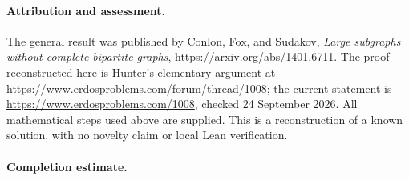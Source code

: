\paragraph{Attribution and assessment.}
The general result was published by Conlon, Fox, and Sudakov, \emph{Large subgraphs without complete bipartite graphs}, \url{https://arxiv.org/abs/1401.6711}. The proof reconstructed here is Hunter's elementary argument at \url{https://www.erdosproblems.com/forum/thread/1008}; the current statement is \url{https://www.erdosproblems.com/1008}, checked 24 September 2026. All mathematical steps used above are supplied. This is a reconstruction of a known solution, with no novelty claim or local Lean verification.

\paragraph{Completion estimate.}
